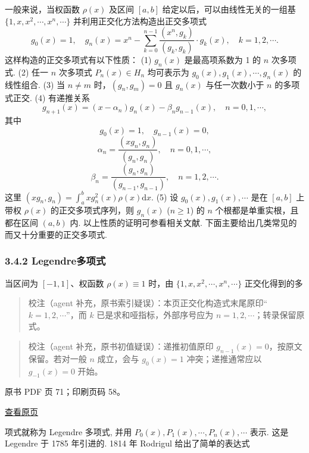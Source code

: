 一般来说，当权函数 \(\rho(x)\) 及区间 \([a, b]\) 给定以后，可以由线性无关的一组基 \(\{1, x, x^2, \cdots, x^n, \cdots\}\) 并利用正交化方法构造出正交多项式 \[
g_0(x) = 1, \quad g_n(x) = x^n - \sum_{k=0}^{n-1} \frac{(x^n, g_k)}{(g_k, g_k)} \cdot g_k(x), \quad k = 1, 2, \cdots.
\] 这样构造的正交多项式有以下性质： (1) \(g_n(x)\) 是最高项系数为 1 的 \(n\) 次多项式. (2) 任一 \(n\) 次多项式 \(P_n(x) \in H_n\) 均可表示为 \(g_0(x), g_1(x), \cdots, g_n(x)\) 的线性组合. (3) 当 \(n \neq m\) 时，\((g_n, g_m) = 0\) 且 \(g_n(x)\) 与任一次数小于 \(n\) 的多项式正交. (4) 有递推关系 \[
g_{n+1}(x) = (x - \alpha_n)g_n(x) - \beta_n g_{n-1}(x), \quad n = 0, 1, \cdots,
\] 其中 \[
g_0(x) = 1, \quad g_{n-1}(x) = 0,
\] \[
\alpha_n = \frac{(xg_n, g_n)}{(g_n, g_n)}, \quad n = 0, 1, \cdots,
\] \[
\beta_n = \frac{(g_n, g_n)}{(g_{n-1}, g_{n-1})}, \quad n = 1, 2, \cdots.
\] 这里 \((xg_n, g_n) = \int_a^b xg_n^2(x) \rho(x) \mathrm{d}x.\) (5) 设 \(g_0(x), g_1(x), \cdots\) 是在 \([a, b]\) 上带权 \(\rho(x)\) 的正交多项式序列，则 \(g_n(x)\) (\(n \geq 1\)) 的 \(n\) 个根都是单重实根，且都在区间 \((a, b)\) 内. 以上性质的证明可参看相关文献. 下面主要给出几类常见的而又十分重要的正交多项式.

\subsubsection{3.4.2 Legendre多项式}\label{ch03a-legendreux591aux9879ux5f0f}

当区间为 \([-1, 1]\)、权函数 \(\rho(x) \equiv 1\) 时，由 \(\{1, x, x^2, \cdots, x^n, \cdots\}\) 正交化得到的多

\begin{quote}
校注（agent 补充，原书索引疑误）：本页正交化构造式末尾原印``\(k=1,2,\cdots\)''，而 \(k\) 已是求和哑指标，外部序号应为 \(n=1,2,\cdots\)；转录保留原式。
\end{quote}

\begin{quote}
校注（agent 补充，原书初值疑误）：递推初值原印 \(g_{n-1}(x)=0\)，按原文保留。若对一般 \(n\) 成立，会与 \(g_0(x)=1\) 冲突；递推通常应以 \(g_{-1}(x)=0\) 开始。
\end{quote}

\clearpage

原书 PDF 页 71；印刷页码 58。

\href{source-images/pdf-071.jpeg}{查看原页}

项式就称为 Legendre 多项式, 并用 \(P_0(x), P_1(x), \cdots, P_n(x), \cdots\) 表示. 这是 Legendre 于 1785 年引进的. 1814 年 Rodrigul 给出了简单的表达式

